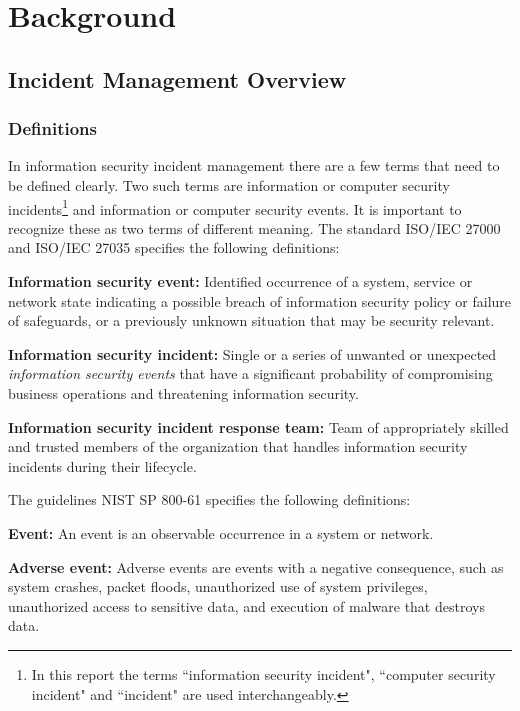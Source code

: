 \chapter{Background}
\label{chp:background}
\section{Incident Management Overview}
\subsection{Definitions}
\label{sec:Definitions}
In information security incident management there are a few terms that need to be defined clearly. Two such terms are information or computer security incidents\footnote{In this report the terms ``information security incident", ``computer security incident" and ``incident" are used interchangeably.} %
and information or computer security events. It is important to recognize these as two terms of different meaning. The standard \acs{ISO}/\acs{IEC} 27000 \cite{ISO/IEC27000} and \acs{ISO}/\acs{IEC} 27035\cite{ISO/IEC27035} specifies the following definitions:

\textbf{Information security event:} Identified occurrence of a system, service or network state indicating a possible breach of information security policy or failure of safeguards, or a previously unknown situation that may be security relevant.

\textbf{Information security incident:} Single or a series of unwanted or unexpected \emph{information security events} that have a significant probability of compromising business operations and threatening information security.

\textbf{Information security incident response team:} Team of appropriately skilled and trusted members of the organization that handles information security incidents during their lifecycle.

The guidelines \acs{NIST} SP 800-61 \cite{nist800-61} specifies the following definitions:

\textbf{Event:} An event is an observable occurrence in a system or network.

\textbf{Adverse event:} Adverse events are events with a negative consequence, such as system crashes, packet floods, unauthorized use of system privileges, unauthorized access to sensitive data, and execution of malware that destroys data.

